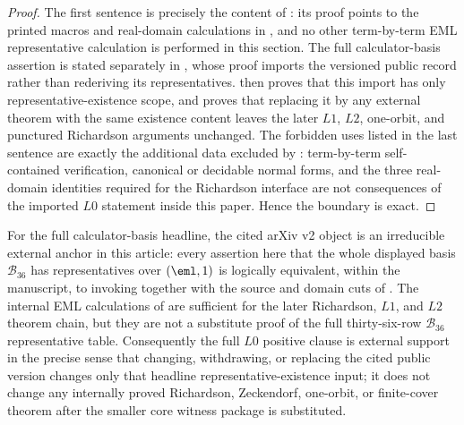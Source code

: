 \begin{proof}
The first sentence is precisely the content of
: its proof points to the printed macros
and real-domain calculations in
, and no other
term-by-term EML representative calculation is performed in this section.  The
full calculator-basis assertion is stated separately in ,
whose proof imports the versioned public record rather than rederiving its
representatives.   then proves that this import
has only representative-existence scope, and
 proves that replacing it by any
external theorem with the same existence content leaves the later \(L1\), \(L2\),
one-orbit, and punctured Richardson arguments unchanged.  The forbidden
uses listed in the last sentence are exactly the additional data excluded by
:
term-by-term self-contained verification, canonical or decidable normal forms,
and the three real-domain identities required for the Richardson interface are
not consequences of the imported \(L0\) statement inside this paper.  Hence the
boundary is exact.
\end{proof}

\begin{proposition}
\label{prop:B36-public-anchor-rigidity}
For the full calculator-basis headline, the cited arXiv v2 object is an
irreducible external anchor in this article: every assertion here that the whole
displayed basis \(\mathcal B_{36}\) has representatives over \((\eml,1)\) is
logically equivalent, within the manuscript, to invoking
 together with the source and domain cuts of
.  The internal EML calculations of
 are sufficient for the later Richardson,
\(L1\), and \(L2\) theorem chain, but they are not a substitute proof of the full
thirty-six-row \(\mathcal B_{36}\) representative table.  Consequently the full
\(L0\) positive clause is external support in the precise sense that changing,
withdrawing, or replacing the cited public version changes only that headline
representative-existence input; it does not change any internally proved
Richardson, Zeckendorf, one-orbit, or finite-cover theorem after the smaller
core witness package is substituted.
\end{proposition}

